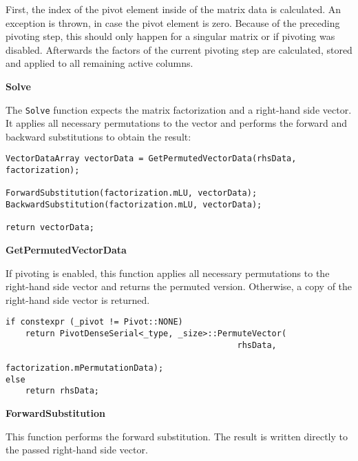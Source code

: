 First, the index of the pivot element inside of the matrix data is calculated.
An exception is thrown, in case the pivot element is zero.
Because of the preceding pivoting step, this should only happen for a singular matrix or if pivoting was disabled.
Afterwards the factors of the current pivoting step are calculated, stored and applied to all remaining active columns.





\vspace{1cm}
\textbf{Solve}
\vspace{0.5cm}

The \texttt{Solve} function expects the matrix factorization and a right-hand side vector.
It applies all necessary permutations to the vector and performs the forward and backward substitutions to obtain the result:

\begin{verbatim}
VectorDataArray vectorData = GetPermutedVectorData(rhsData, factorization);

ForwardSubstitution(factorization.mLU, vectorData);
BackwardSubstitution(factorization.mLU, vectorData);

return vectorData;
\end{verbatim}




\vspace{1cm}
\textbf{GetPermutedVectorData}
\vspace{0.5cm}

If pivoting is enabled, this function applies all necessary permutations to the right-hand side vector and returns the permuted version.
Otherwise, a copy of the right-hand side vector is returned.

\begin{verbatim}
if constexpr (_pivot != Pivot::NONE)
    return PivotDenseSerial<_type, _size>::PermuteVector(
                                               rhsData, 
                                               factorization.mPermutationData);
else
    return rhsData;
\end{verbatim}





\vspace{1cm}
\textbf{ForwardSubstitution}
\vspace{0.5cm}

This function performs the forward substitution.
The result is written directly to the passed right-hand side vector.

